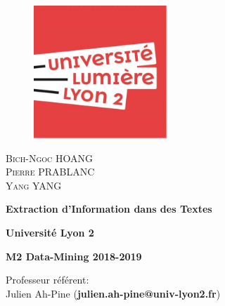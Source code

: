 
\begin{titlepage}

\begin{figure}[ht]
	\begin{minipage}[t]{0.5\linewidth}
		\begin{flushleft}
			\vspace{0pt}
			\includegraphics[width=5cm, keepaspectratio]{media/img/logo/logo_lyon2.eps}
		\end{flushleft}
	\end{minipage}
\end{figure}
\vfill


\begin{center}

	\textsc{\Large Bich-Ngoc HOANG}\\[0.2cm]
	\textsc{\Large Pierre PRABLANC}\\[0.2cm]
	\textsc{\Large Yang YANG}\\[0.2cm]
	\vfill

	{\Huge
		\textbf{Extraction d’Information dans des Textes} \\[0.3cm]
	}
	\vfill

	{\Large
		\textbf{Université Lyon 2}
	}
	\vfill
	
	{\Large
		\textbf{M2 Data-Mining 2018-2019}
	}
	\vfill

\end{center}
\vfill


\begin{flushleft}
	{\Large
		Professeur référent:\\
		Julien Ah-Pine (\textbf{julien.ah-pine@univ-lyon2.fr})
	}
\end{flushleft}
\vfill

\clearpage
\setcounter{page}{1}

\restoregeometry%

\end{titlepage}
